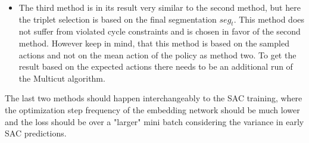 \begin{itemize}
 	\item The third method is in its result very similar to the second method, but here the triplet selection is based on the final segmentation $seg_t$. This method does not suffer from violated cycle constraints and is chosen in favor of the second method. However keep in mind, that this method is based on the sampled actions and not on the mean action of the policy as method two. To get the result based on the expected actions there needs to be an additional run of the Multicut algorithm.
\end{itemize}
The last two methods should happen interchangeably to the SAC training, where the optimization step frequency of the embedding network should be much lower and the loss should be over a "larger" mini batch considering the variance in early SAC predictions.
